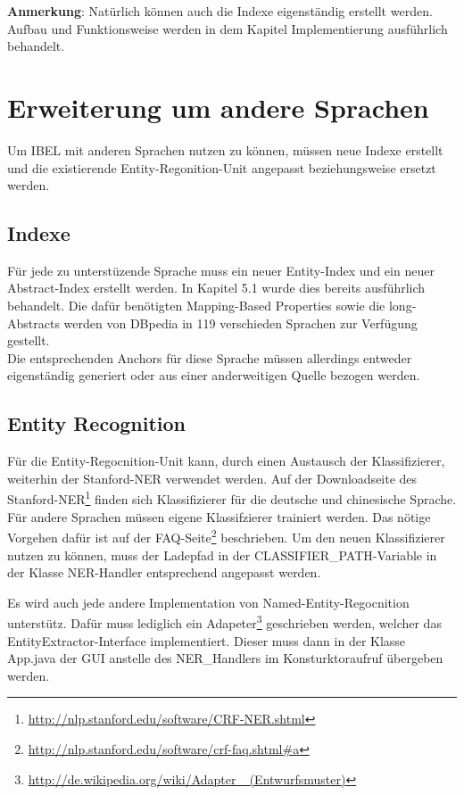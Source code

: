 \documentclass[11pt, a4paper, oneside]{Thesis} %
\begin{document}
\textbf{Anmerkung}: Nat\"urlich k\"onnen auch die Indexe eigenst\"andig erstellt werden. Aufbau und Funktionsweise werden in dem Kapitel \glqq Implementierung \grqq ausf\"uhrlich behandelt.
\section{Erweiterung um andere Sprachen}
Um IBEL mit anderen Sprachen nutzen zu k\"onnen, m\"ussen neue Indexe erstellt und die existierende Entity-Regonition-Unit angepasst beziehungsweise ersetzt werden.

\subsection{Indexe}
F\"ur jede zu unterst\"uzende Sprache muss ein neuer Entity-Index und ein neuer Abstract-Index erstellt werden. In Kapitel 5.1 wurde dies bereits ausf\"uhrlich behandelt.
Die daf\"ur ben\"otigten Mapping-Based Properties sowie die long-Abstracts werden von DBpedia in 119 verschieden Sprachen zur Verf\"ugung gestellt. \\
Die entsprechenden Anchors f\"ur diese Sprache müssen allerdings entweder eigenst\"andig generiert oder aus einer anderweitigen Quelle bezogen werden.

\subsection{Entity Recognition}
F\"ur die Entity-Regocnition-Unit kann, durch einen Austausch der Klassifizierer, weiterhin der Stanford-NER verwendet werden.  
Auf der Downloadseite des Stanford-NER\footnote{\url{http://nlp.stanford.edu/software/CRF-NER.shtml}} finden sich Klassifizierer f\"ur die deutsche und chinesische Sprache. F\"ur andere Sprachen m\"ussen eigene Klassifzierer trainiert werden. Das n\"otige Vorgehen daf\"ur ist auf der FAQ-Seite\footnote{\url{http://nlp.stanford.edu/software/crf-faq.shtml\#a}} beschrieben. Um den neuen Klassifizierer nutzen zu k\"onnen, muss der Ladepfad in der CLASSIFIER\_PATH-Variable in der Klasse NER-Handler entsprechend angepasst werden.

Es wird auch jede andere Implementation von Named-Entity-Regocnition unterst\"utz. Daf\"ur muss lediglich ein  Adapeter\footnote{\url{http://de.wikipedia.org/wiki/Adapter
\_(Entwurfsmuster)}} geschrieben werden, welcher das EntityExtractor-Interface implementiert. Dieser muss dann in der Klasse App.java der GUI anstelle des NER\_Handlers im Konsturktoraufruf \"ubergeben werden.
\end{document}
